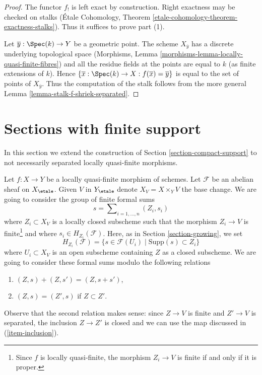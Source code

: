 \begin{proof}
The functor $f_!$ is left exact by construction. Right exactness may
be checked on stalks
(\'Etale Cohomology, Theorem \ref{etale-cohomology-theorem-exactness-stalks}).
Thus it suffices to prove part (1).

\medskip\noindent
Let $\overline{y} : \Spec(k) \to Y$ be a geometric point.
The scheme $X_{\overline{y}}$ has a discrete underlying
topological space
(Morphisms, Lemma \ref{morphisms-lemma-locally-quasi-finite-fibres})
and all the residue fields at the points are equal to $k$
(as finite extensions of $k$). Hence
$\{\overline{x} : \Spec(k) \to X : f(\overline{x}) = \overline{y}\}$
is equal to the set of points of $X_{\overline{y}}$.
Thus the computation of the stalk follows from the more general
Lemma \ref{lemma-stalk-f-shriek-separated}.
\end{proof}









\section{Sections with finite support}
\label{section-finite-support}

\noindent
In this section we extend the construction of
Section \ref{section-compact-support} to not necessarily
separated locally quasi-finite morphisms.

\medskip\noindent
Let $f : X \to Y$ be a locally quasi-finite morphism of schemes.
Let $\mathcal{F}$ be an abelian sheaf on $X_\etale$. Given $V$ in
$Y_\etale$ denote $X_V = X \times_Y V$ the base change. We are going
to consider the group of finite formal sums
\begin{equation}
\label{equation-formal-sum}
s = \sum\nolimits_{i = 1, \ldots, n} (Z_i, s_i)
\end{equation}
where $Z_i \subset X_V$ is a locally closed subscheme such that the
morphism $Z_i \to V$ is finite\footnote{Since $f$ is locally quasi-finite,
the morphism $Z_i \to V$ is finite if and only if it is proper.}
and where $s_i \in H_{Z_i}(\mathcal{F})$. Here, as in
Section \ref{section-growing}, we set
$$
H_{Z_i}(\mathcal{F}) =
\{s \in \mathcal{F}(U_i) \mid \text{Supp}(s) \subset Z_i\}
$$
where $U_i \subset X_V$ is an open subscheme containing $Z$ as a
closed subscheme. We are going to consider these formal sums modulo the
following relations
\begin{enumerate}
\item
\label{item-sum}
$(Z, s) + (Z, s') = (Z, s + s')$,
\item
\label{item-sub}
$(Z, s) = (Z', s)$ if $Z \subset Z'$.
\end{enumerate}
Observe that the second relation makes sense: since $Z \to V$ is finite
and $Z' \to V$ is separated, the inclusion $Z \to Z'$ is closed and we
can use the map discussed in (\ref{item-inclusion}).

